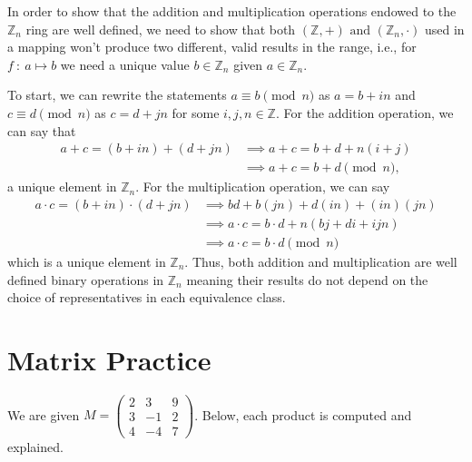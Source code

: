 \documentclass[12pt]{article}
\newenvironment{answer}
    {\begin{adjustwidth}{0pt}{0pt}}
    {\end{adjustwidth}}
\theoremstyle{remark}  %
\begin{document}
    \begin{answer}
        In order to show that the addition and multiplication operations endowed to the $\mathbb{Z}_n$ ring are well defined, we need to show that both $(\mathbb{Z},+)\text{ and }(\mathbb{Z}_n,\cdot)$ used in a mapping won't produce two different, valid results in the range, i.e., for $f\ :\ a\mapsto b$ we need a unique value $b\in\mathbb{Z}_n$ given $a\in\mathbb{Z}_n$. \par To start, we can rewrite the statements $a\equiv b\pmod{n}$ as $a=b+in$ and $c\equiv d\pmod{n}$ as $c=d+jn$ for some $i,j,n\in\mathbb{Z}$. For the addition operation, we can say that 
        \begin{align*}
            a + c = (b + in) + (d +jn) &\implies a+c = b+d + n(i+j) \\
            &\implies a+c=b+d\pmod{n},
        \end{align*}
        a unique element in $\mathbb{Z}_n$. For the multiplication operation, we can say 
        \begin{align*}    
        a\cdot c = (b + in)\cdot(d+jn) &\implies bd + b(jn) + d(in) + (in)(jn) \\
        &\implies a \cdot c = b\cdot d + n(bj+di+ijn) \\
        &\implies a \cdot c = b \cdot d \pmod{n}
        \end{align*}
        which is a unique element in $\mathbb{Z}_n$. Thus, both addition and multiplication are well defined binary operations in $\mathbb{Z}_n$ meaning their results do not depend on the choice of representatives in each equivalence class.
    \end{answer}

\section*{Matrix Practice}

We are given $
M = \begin{pmatrix}
2 & 3 & 9 \\
3 & -1 & 2 \\
4 & -4 & 7
\end{pmatrix}$.
Below, each product is computed and explained.
\end{document}
